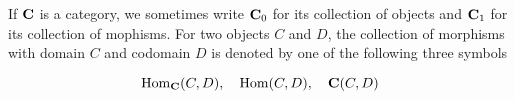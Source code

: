 \documentclass[11pt]{article}
\begin{document}
\begin{center}
\end{center}

If \(\operatorname{\textbf{C}}\) is a category, we sometimes write \(\operatorname{\textbf{C}}_0\) for its collection of
objects and \(\operatorname{\textbf{C}}_1\) for its collection of mophisms. For two objects \(C\) and
\(D\), the collection of morphisms with domain \(C\) and codomain \(D\) is denoted
by one of the following three symbols

\begin{equation*}
\operatorname{Hom}_{\operatorname{\textbf{C}}}(C,D),\quad\operatorname{Hom}(C,D),\quad\operatorname{\textbf{C}}(C,D)
\end{equation*}
\end{document}

